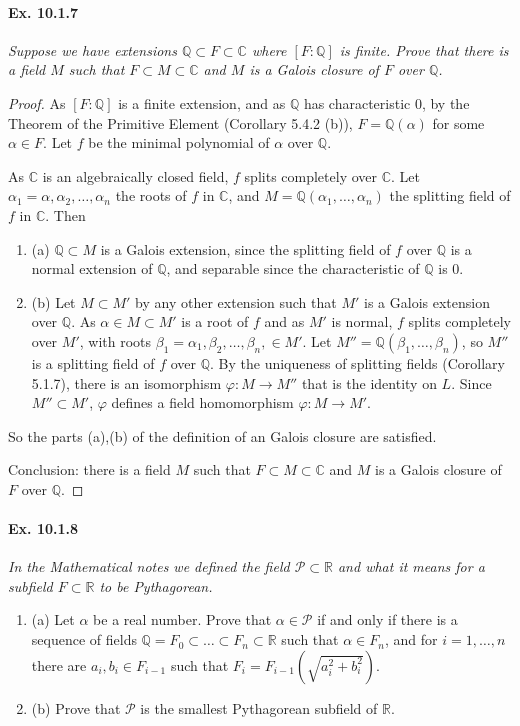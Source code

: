 \documentclass[11pt,a4paper]{article}
\newcommand{\be} {\begin{enumerate}}
\newcommand{\ee} {\end{enumerate}}
\newcommand{\Q}{\mathbb{Q}}
\newcommand{\R}{\mathbb{R}}
\newcommand{\C}{\mathbb{C}}
\begin{document}
\paragraph{Ex. 10.1.7}

{\it Suppose we have extensions $\Q\subset F \subset \C$ where $[F:\Q]$ is finite. Prove that there is a field $M$ such that $F \subset M \subset \C$ and $M$ is a Galois closure of $F$ over $\Q$.
}

\begin{proof}
As $[F:\Q]$ is a finite extension, and as $\Q$ has characteristic 0, by the Theorem of the Primitive Element (Corollary 5.4.2 (b)), $F = \Q(\alpha)$ for some $\alpha \in F$. Let $f$ be the minimal polynomial of $\alpha$ over $\Q$.

As $\C$ is an algebraically closed field, $f$ splits completely over $\C$. Let $\alpha_1=\alpha,\alpha_2,\ldots,\alpha_n$ the roots of $f$ in $\C$, and $M = \Q(\alpha_1,\ldots,\alpha_n)$ the splitting field of $f$ in $\C$. Then
\be
\item[(a)] $\Q \subset M$ is a Galois extension, since the splitting field of $f$ over $\Q$ is a normal extension of $\Q$, and separable since the characteristic of $\Q$ is 0.
\item[(b)] Let $M \subset M'$ by any other extension such that $M'$ is a Galois extension over $\Q$. As $\alpha \in M \subset M'$ is a root of $f$ and as $M'$ is normal, $f$ splits completely over $M'$, with roots $\beta_1 = \alpha_1,\beta_2,\ldots,\beta_n, \in M'$. Let $M'' = \Q(\beta_1,\ldots,\beta_n)$, so $M''$ is a splitting field of $f$ over $\Q$. By the uniqueness of splitting fields (Corollary 5.1.7), there is an isomorphism $\varphi:M\to M''$ that is the identity on $L$. Since $M'' \subset M'$, $\varphi$ defines a field homomorphism $\varphi:M \to M'$.
\ee
So the parts (a),(b) of the definition of an Galois closure are satisfied.

Conclusion: there is a field $M$ such that $F \subset M \subset \C$ and $M$ is a Galois closure of $F$ over $\Q$.
\end{proof}

\paragraph{Ex. 10.1.8}

{\it In the Mathematical notes we defined the field ${\mathscr P} \subset \R$ and what it means for a subfield $F \subset \R$ to be Pythagorean.
\be

\item[(a)] Let $\alpha$ be a real number. Prove that $\alpha \in {\mathscr P} $ if and only if there is a sequence of fields $\Q = F_0\subset \ldots \subset F_n \subset \R$ such that $\alpha \in F_n$, and for $i=1,\ldots,n$ there are $a_i,b_i \in F_{i-1}$ such that $F_i = F_{i-1}\left(\sqrt{a_i^2+b_i^2}\right)$.
\item[(b)] Prove that ${\mathscr P} $ is the smallest Pythagorean subfield of $\R$.
\ee
}
\end{document}
